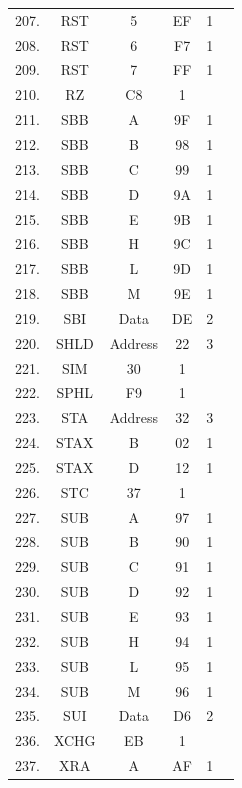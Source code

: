 \documentclass{scrreprt}
\begin{document}
\begin{longtable}{|c|c|c|c|c|c|}
207. & RST  & 5            & EF   & 1  &   \\
208. & RST  & 6            & F7   & 1  &   \\
209. & RST  & 7            & FF   & 1  &   \\
210. & RZ   & C8           & 1    &    &   \\
211. & SBB  & A            & 9F   & 1  &   \\
212. & SBB  & B            & 98   & 1  &   \\
213. & SBB  & C            & 99   & 1  &   \\
214. & SBB  & D            & 9A   & 1  &   \\
215. & SBB  & E            & 9B   & 1  &   \\
216. & SBB  & H            & 9C   & 1  &   \\
217. & SBB  & L            & 9D   & 1  &   \\
218. & SBB  & M            & 9E   & 1  &   \\
219. & SBI  & Data         & DE   & 2  &   \\
220. & SHLD & Address      & 22   & 3  &   \\
221. & SIM  & 30           & 1    &    &   \\
222. & SPHL & F9           & 1    &    &   \\
223. & STA  & Address      & 32   & 3  &   \\
224. & STAX & B            & 02   & 1  &   \\
225. & STAX & D            & 12   & 1  &   \\
226. & STC  & 37           & 1    &    &   \\
227. & SUB  & A            & 97   & 1  &   \\
228. & SUB  & B            & 90   & 1  &   \\
229. & SUB  & C            & 91   & 1  &   \\
230. & SUB  & D            & 92   & 1  &   \\
231. & SUB  & E            & 93   & 1  &   \\
232. & SUB  & H            & 94   & 1  &   \\
233. & SUB  & L            & 95   & 1  &   \\
234. & SUB  & M            & 96   & 1  &   \\
235. & SUI  & Data         & D6   & 2  &   \\
236. & XCHG & EB           & 1    &    &   \\
237. & XRA  & A            & AF   & 1  &   \\

\end{longtable}
\end{document}
